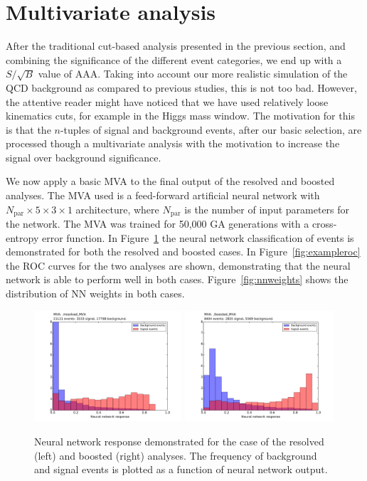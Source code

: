 
\section{Multivariate analysis}
\label{sec:mva}

After the traditional cut-based analysis presented in the previous section,
and combining the significance of the different event categories,
we end up with a $S/\sqrt{B}$ value of AAA.
%
Taking into account our more realistic simulation of the QCD background as
compared to previous studies, this is not too bad.
%
However, the attentive reader might have noticed that we have used
relatively 
loose kinematics cuts, for example in the Higgs mass window.
%
The motivation for this is that the $n$-tuples of signal and background
events, after our basic selection, are processed though a multivariate
analysis with the motivation to increase the signal over background
significance.


We now apply a basic MVA to the final output of the resolved and boosted analyses. The MVA used is a feed-forward artificial neural network with $N_{\mathrm{par}}\times5\times3\times1$ architecture, where $N_{\mathrm{par}}$ is the number of input parameters for the network. The MVA was trained for 50,000 GA generations with a cross-entropy error function. In Figure~\ref{fig:nnresponse} the neural network classification of events is demonstrated for both the resolved and boosted cases. In Figure~\ref{fig:exampleroc} the ROC curves for the two analyses are shown, demonstrating that the neural network is able to
perform well in both cases. Figure~\ref{fig:nnweights} shows the distribution of NN weights in both cases.


\begin{figure}[h]
\begin{center}
\includegraphics[width=0.49\textwidth]{plots/resolved_MVA_hist.pdf}
\includegraphics[width=0.49\textwidth]{plots/boosted_MVA_hist.pdf}
\caption{Neural network response demonstrated for the case of the resolved (left) and boosted (right) analyses. The frequency of background and signal events is plotted as a function of neural network output.}
\label{fig:nnresponse}
\end{center}
\end{figure}

